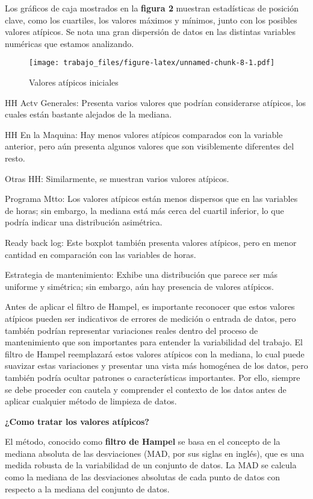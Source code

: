 \documentclass[
  11pt,
  bookmarksnumbered]{article}
\begin{document}
Los gráficos de caja mostrados en la \textbf{figura 2} muestran estadísticas de posición clave, como los cuartiles, los valores máximos y mínimos, junto con los posibles valores atípicos.
Se nota una gran dispersión de datos en las distintas variables numéricas que estamos analizando.

\begin{figure}
\centering
\texttt{[image: trabajo\_files/figure-latex/unnamed-chunk-8-1.pdf]}
\caption{\label{fig:unnamed-chunk-8}Valores atípicos iniciales}
\end{figure}

HH Actv Generales: Presenta varios valores que podrían considerarse atípicos, los cuales están bastante alejados de la mediana.

HH En la Maquina: Hay menos valores atípicos comparados con la variable anterior, pero aún presenta algunos valores que son visiblemente diferentes del resto.

Otras HH: Similarmente, se muestran varios valores atípicos.

Programa Mtto: Los valores atípicos están menos dispersos que en las variables de horas; sin embargo, la mediana está más cerca del cuartil inferior, lo que podría indicar una distribución asimétrica.

Ready back log: Este boxplot también presenta valores atípicos, pero en menor cantidad en comparación con las variables de horas.

Estrategia de mantenimiento: Exhibe una distribución que parece ser más uniforme y simétrica; sin embargo, aún hay presencia de valores atípicos.

Antes de aplicar el filtro de Hampel, es importante reconocer que estos valores atípicos pueden ser indicativos de errores de medición o entrada de datos, pero también podrían representar variaciones reales dentro del proceso de mantenimiento que son importantes para entender la variabilidad del trabajo.
El filtro de Hampel reemplazará estos valores atípicos con la mediana, lo cual puede suavizar estas variaciones y presentar una vista más homogénea de los datos, pero también podría ocultar patrones o características importantes.
Por ello, siempre se debe proceder con cautela y comprender el contexto de los datos antes de aplicar cualquier método de limpieza de datos.

\textbf{¿Como tratar los valores atípicos?}

El método, conocido como \textbf{filtro de Hampel} se basa en el concepto de la mediana absoluta de las desviaciones (MAD, por sus siglas en inglés), que es una medida robusta de la variabilidad de un conjunto de datos.
La MAD se calcula como la mediana de las desviaciones absolutas de cada punto de datos con respecto a la mediana del conjunto de datos.
\end{document}
